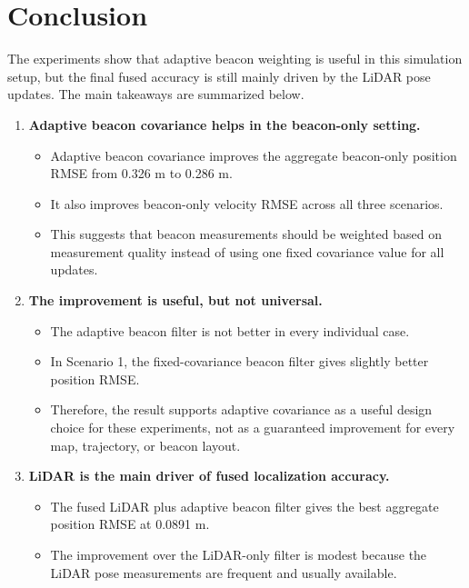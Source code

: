 \section{Conclusion}

The experiments show that adaptive beacon weighting is useful in this simulation setup, but the final fused accuracy is still mainly driven by the LiDAR pose updates. The main takeaways are summarized below.

\begin{enumerate}
    \item \textbf{Adaptive beacon covariance helps in the beacon-only setting.}
    \begin{itemize}
        \item Adaptive beacon covariance improves the aggregate beacon-only position RMSE from 0.326 m to 0.286 m.

        \item It also improves beacon-only velocity RMSE across all three scenarios.

        \item This suggests that beacon measurements should be weighted based on measurement quality instead of using one fixed covariance value for all updates.
    \end{itemize}

    \item \textbf{The improvement is useful, but not universal.}
    \begin{itemize}
        \item The adaptive beacon filter is not better in every individual case.

        \item In Scenario 1, the fixed-covariance beacon filter gives slightly better position RMSE.

        \item Therefore, the result supports adaptive covariance as a useful design choice for these experiments, not as a guaranteed improvement for every map, trajectory, or beacon layout.
    \end{itemize}

    \item \textbf{LiDAR is the main driver of fused localization accuracy.}
    \begin{itemize}
        \item The fused LiDAR plus adaptive beacon filter gives the best aggregate position RMSE at 0.0891 m.

        \item The improvement over the LiDAR-only filter is modest because the LiDAR pose measurements are frequent and usually available.


\end{itemize}
\end{enumerate}
